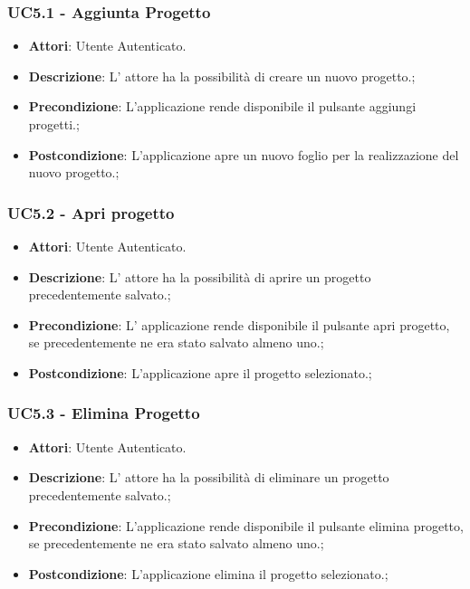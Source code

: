 \subsubsection{UC5.1 - Aggiunta Progetto} 
\label{sssec:UC5.1} 
\begin{itemize} 
\item \textbf{Attori}: Utente Autenticato.
\item \textbf{Descrizione}: L’ attore ha la possibilità di creare un nuovo progetto.;
\item \textbf{Precondizione}: L’applicazione rende disponibile il pulsante aggiungi progetti.;
\item \textbf{Postcondizione}: L’applicazione apre un nuovo foglio per la realizzazione del nuovo progetto.;
\end{itemize} 
\subsubsection{UC5.2 - Apri progetto} 
\label{sssec:UC5.2} 
\begin{itemize} 
\item \textbf{Attori}: Utente Autenticato.
\item \textbf{Descrizione}: L’ attore ha la possibilità di aprire un progetto precedentemente salvato.;
\item \textbf{Precondizione}: L’ applicazione rende disponibile il pulsante apri progetto, se precedentemente ne era stato salvato almeno uno.;
\item \textbf{Postcondizione}: L’applicazione apre il progetto selezionato.;
\end{itemize} 
\subsubsection{UC5.3 - Elimina Progetto} 
\label{sssec:UC5.3} 
\begin{itemize} 
\item \textbf{Attori}: Utente Autenticato.
\item \textbf{Descrizione}: L' attore ha la possibilità di eliminare un progetto precedentemente salvato.;
\item \textbf{Precondizione}: L’applicazione rende disponibile il pulsante elimina progetto, se precedentemente ne era stato salvato almeno uno.;
\item \textbf{Postcondizione}: L’applicazione elimina il progetto selezionato.;
\end{itemize} 
